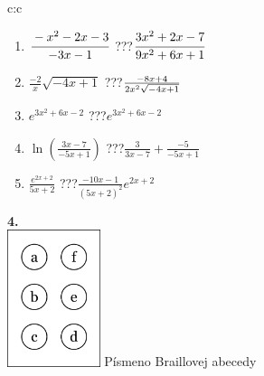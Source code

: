 \documentclass[10pt]{report}
\begin{document}
\begin{tabular}{c:c}
\begin{minipage}[c][104.5mm][t]{0.5\linewidth}
\begin{center}
\begin{minipage}{0.79\linewidth}
\begin{center}
\begin{varwidth}{\linewidth}
\begin{enumerate}
\item $\cfrac{-x^2-2x-3}{-3x-1}$\quad \dotfill\; ???\;\dotfill \quad $\cfrac{3x^2+2x-7}{9x^2+6x+1}$
\item $\frac{-2}{x}\sqrt{-4x+1}$\quad \dotfill\; ???\;\dotfill \quad $\frac{-8x+4}{2x^2 \sqrt{\smash[b]{-4x+1}}}$
\item $e^{3x^2+6x-2}$\quad \dotfill\; ???\;\dotfill \quad $e^{3x^2+6x-2}$
\item $\ln{\left(\frac{3x-7}{-5x+1}\right)}$\quad \dotfill\; ???\;\dotfill \quad $\frac{3}{3x-7}+\frac{-5}{-5x+1}$
\item $\frac{e^{2x+2}}{5x+2}$\quad \dotfill\; ???\;\dotfill \quad $\frac{-10x-1}{(5x+2)^2}e^{2x+2}$
\end{enumerate}
\end{varwidth}
\end{center}
\end{minipage}
\begin{minipage}{0.20\linewidth}
\begin{center}
{\Huge\bfseries 4.} \\[2mm]
\includegraphics[height=40mm]{../images/braille.png}
{\small Písmeno Braillovej abecedy}
\end{center}
\end{minipage}
\end{center}
\end{minipage}
%
\end{tabular}
\newpage
\thispagestyle{empty}
\end{document}
